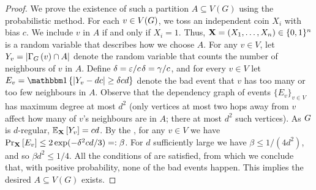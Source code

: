 \documentclass[11pt]{article}
\providecommand{\DIFadd}[1]{\textcolor{shin-ryoku}{#1}}%
\providecommand{\DIFdel}[1]{\textcolor{verylightgray}{\sout{#1}}}                      %
\providecommand{\DIFaddbegin}{} %
\providecommand{\DIFaddend}{} %
\providecommand{\DIFdelbegin}{} %
\providecommand{\DIFdelend}{} %
\begin{document}
\begin{proof}
We prove the existence of such a partition $A \subseteq V(G)$ using the probabilistic method.
For each $v \in \Vertices{\Graph}$, we toss an independent coin $X_i$ with bias $c$.
We include $v$ in $A$ if and only if $X_i = 1$. Thus, $\vec{X} \Def (X_1, \dots, X_n) \in \bit^n$ is a random variable that describes how we choose $A$. For any $v \in V$, let $Y_v \Def |\Neighbourhood{G}{v} \cap \RedA|$ denote the random variable that counts the number of neighbours of $v$ in $A$.
Define \DIFdelbegin \DIFdel{$\delta \Def \epsilon / c$}\DIFdelend \DIFaddbegin \DIFadd{$\delta \Def \gamma / c$}\DIFaddend , and for every $v \in V$ let $E_v = \Indicator{|Y_v - d c | \geq \delta c d}$ denote the bad event that $v$ has too many or too few neighbours in $A$.
Observe that the dependency graph of events $\{ E_v \}_{v \in V}$ has maximum degree at most $d^2$ (only vertices at most two hops away from $v$ affect how many of $v$'s neighbours are in $A$; there at most $d^2$ such vertices).
As $\Graph$ is $d$-regular, $\Mean{\vec{X}}{Y_v} = c d$. By the , for any $v \in V$ we have $\PProb{E_v}{\vec{X}} \leq 2\exp(-\delta^2c d/3) =: \beta$.
For $d$ sufficiently large we have $\beta \leq 1/(4d^2)$, and so $\beta d^2 \leq 1/4$. All the conditions of  are satisfied, from which we conclude that, with positive probability, none of the bad events happen. This implies the desired $A \subseteq V(G)$ exists.
\end{proof}


\end{document}
